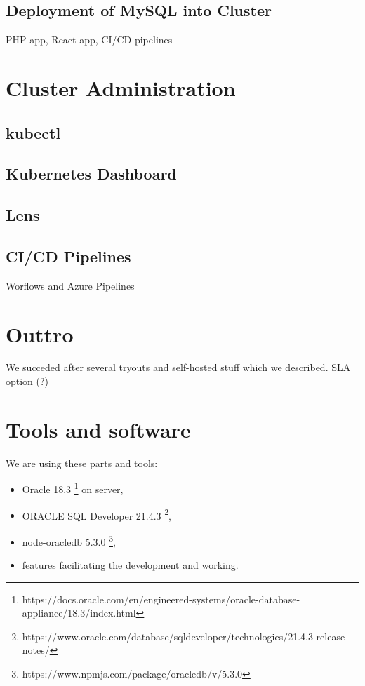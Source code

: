 \documentclass{article}
\begin{document}
\subsection{Deployment of MySQL into Cluster}
PHP app, React app, CI/CD pipelines
\section{Cluster Administration}
\subsection{kubectl}
\subsection{Kubernetes Dashboard}
\subsection{Lens}
\subsection{CI/CD Pipelines}
Worflows and Azure Pipelines
\section{Outtro}
We succeded after several tryouts and self-hosted stuff which we described.
SLA option (?)
\section{Tools and software}

We are using these parts and tools:
\begin{itemize}
\item Oracle 18.3 \footnote{https://docs.oracle.com/en/engineered-systems/oracle-database-appliance/18.3/index.html} on server,
\item ORACLE SQL Developer 21.4.3 \footnote{https://www.oracle.com/database/sqldeveloper/technologies/21.4.3-release-notes/},
\item node-oracledb 5.3.0 \footnote{https://www.npmjs.com/package/oracledb/v/5.3.0},
\item features facilitating the development and working.
\end{itemize}

\newpage
\end{document}
